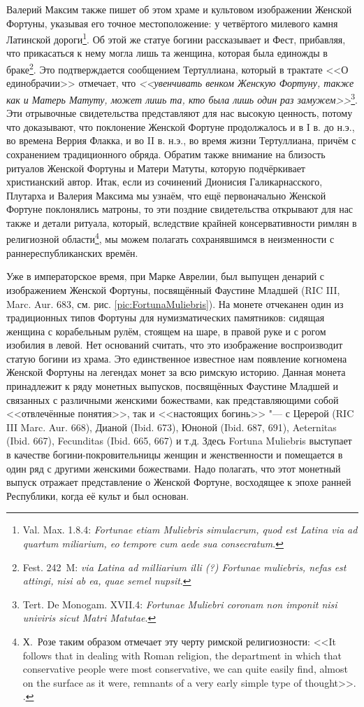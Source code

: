 Валерий Максим также пишет об этом храме и культовом изображении Женской Фортуны, указывая его точное местоположение: у четвёртого милевого камня Латинской дороги\footnote{Val. Max. 1.8.4: \textit{Fortunae etiam Muliebris simulacrum, quod est Latina via ad quartum miliarium, eo tempore cum aede sua consecratum}.}. Об этой же статуе богини рассказывает и Фест, прибавляя, что прикасаться к нему могла лишь та женщина, которая была единожды в браке\footnote{Fest. 242~M: \textit{via Latina ad milliarium illi (?) Fortunae muliebris, nefas est attingi, nisi ab ea, quae semel nupsit}.}. Это подтверждается сообщением Тертуллиана, который в трактате <<О единобрачии>> отмечает, что \textit{<<увенчивать венком Женскую Фортуну, также как и Матерь Матуту, может лишь та, кто была лишь один раз замужем>>}\footnote{Tert. De Monogam. XVII.4: \textit{Fortunae Muliebri coronam non imponit nisi univiris sicut Matri Matutae}.}. Эти отрывочные свидетельства представляют для нас высокую ценность, потому что доказывают, что поклонение Женской Фортуне продолжалось и в I в. до н.э., во времена Веррия Флакка, и во II в. н.э., во время жизни Тертуллиана, причём с сохранением традиционного обряда. Обратим также внимание на близость ритуалов Женской Фортуны и Матери Матуты, которую подчёркивает христианский автор. Итак, если из сочинений Дионисия Галикарнасского, Плутарха и Валерия Максима мы узнаём, что ещё первоначально Женской Фортуне поклонялись матроны, то эти поздние свидетельства открывают для нас также и детали ритуала, который, вследствие крайней консервативности римлян в религиозной области\footnote{Х.~Розе таким образом отмечает эту черту римской религиозности: <<It follows that in dealing with Roman religion, the department in which that conservative people were most conservative, we can quite easily find, almost on the surface as it were, remnants of a very early simple type of thought>>. \cite[P. 158]{Rose1959}.}, мы можем полагать сохранявшимся в неизменности с раннереспубликанских времён.

Уже в императорское время, при Марке Аврелии, был выпущен денарий с изображением Женской Фортуны, посвящённый Фаустине Младшей (RIC III, Marc. Aur. 683, см. рис. \ref{pic:FortunaMuliebris}). На монете отчеканен один из традиционных типов Фортуны для нумизматических памятников: сидящая женщина с корабельным рулём, стоящем на шаре, в правой руке и с рогом изобилия в левой. Нет оснований считать, что это изображение воспроизводит статую богини из храма. Это единственное известное нам появление когномена Женской Фортуны на легендах монет за всю римскую историю. Данная монета принадлежит к ряду монетных выпусков, посвящённых Фаустине Младшей и связанных с различными женскими божествами, как представляющими собой <<отвлечённые понятия>>, так и <<настоящих богинь>> "--- с Церерой (RIC III Marc. Aur. 668), Дианой (Ibid. 673), Юноной (Ibid. 687, 691), Aeternitas (Ibid. 667), Fecunditas (Ibid. 665, 667) и т.д. Здесь Fortuna Muliebris выступает в качестве богини-покровительницы женщин и женственности и помещается в один ряд с другими женскими божествами. Надо полагать, что этот монетный выпуск отражает представление о Женской Фортуне, восходящее к эпохе ранней Республики, когда её культ и был основан.

